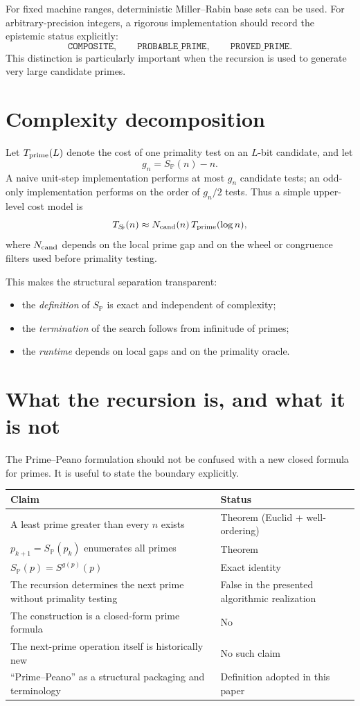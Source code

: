 \documentclass[11pt]{article}
\theoremstyle{definition}
\newcommand{\Pp}{\mathbb{P}}
\newcommand{\SP}{S_{\!\Pp}}
\newcommand{\gap}{g}
\begin{document}
For fixed machine ranges, deterministic Miller--Rabin base sets can be used. For arbitrary-precision integers, a rigorous implementation should record the epistemic status explicitly:
\[
\texttt{COMPOSITE},\qquad \texttt{PROBABLE\_PRIME},\qquad \texttt{PROVED\_PRIME}.
\]
This distinction is particularly important when the recursion is used to generate very large candidate primes.

\section{Complexity decomposition}

Let $T_{\rm prime}(L)$ denote the cost of one primality test on an $L$-bit candidate, and let
\[
\gap_n=\SP(n)-n.
\]
A naive unit-step implementation performs at most $\gap_n$ candidate tests; an odd-only implementation performs on the order of $\gap_n/2$ tests. Thus a simple upper-level cost model is
\[
T_{\SP}(n)\approx N_{\rm cand}(n)\,T_{\rm prime}(\log n),
\]
where $N_{\rm cand}$ depends on the local prime gap and on the wheel or congruence filters used before primality testing.

This makes the structural separation transparent:
\begin{itemize}
\item the \emph{definition} of $\SP$ is exact and independent of complexity;
\item the \emph{termination} of the search follows from infinitude of primes;
\item the \emph{runtime} depends on local gaps and on the primality oracle.
\end{itemize}

\section{What the recursion is, and what it is not}

The Prime--Peano formulation should not be confused with a new closed formula for primes. It is useful to state the boundary explicitly.

\begin{center}
\begin{tabular}{@{}p{}p{}@{}}
\toprule
\textbf{Claim} & \textbf{Status}\\
\midrule
A least prime greater than every $n$ exists & Theorem (Euclid + well-ordering)\\
$p_{k+1}=\SP(p_k)$ enumerates all primes & Theorem\\
$\SP(p)=S^{\gap(p)}(p)$ & Exact identity\\
The recursion determines the next prime without primality testing & False in the presented algorithmic realization\\
The construction is a closed-form prime formula & No\\
The next-prime operation itself is historically new & No such claim\\
``Prime--Peano'' as a structural packaging and terminology & Definition adopted in this paper\\
\bottomrule
\end{tabular}
\end{center}
\end{document}
